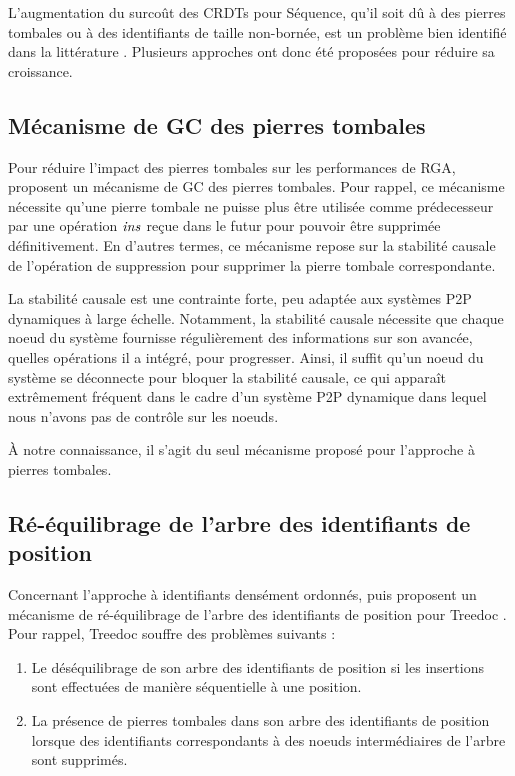 L'augmentation du surcoût des \acp{CRDT} pour Séquence, qu'il soit dû à des pierres tombales ou à des identifiants de taille non-bornée, est un problème bien identifié dans la littérature \cite{ROH2011354,2009-treedoc-preguica,letia:hal-01248270,zawirski:hal-01248197,lseq2013,lseq2017}.
Plusieurs approches ont donc été proposées pour réduire sa croissance.

\subsection{Mécanisme de \ac{GC} des pierres tombales}

Pour réduire l'impact des pierres tombales sur les performances de \ac{RGA}, \textcite{ROH2011354} proposent un mécanisme de \ac{GC} des pierres tombales.
Pour rappel, ce mécanisme nécessite qu'une pierre tombale ne puisse plus être utilisée comme prédecesseur par une opération $\mathit{ins}$ reçue dans le futur pour pouvoir être supprimée définitivement.
En d'autres termes, ce mécanisme repose sur la stabilité causale de l'opération de suppression pour supprimer la pierre tombale correspondante.

La stabilité causale est une contrainte forte, peu adaptée aux systèmes \ac{P2P} dynamiques à large échelle.
Notamment, la stabilité causale nécessite que chaque noeud du système fournisse régulièrement des informations sur son avancée, \ie quelles opérations il a intégré, pour progresser.
Ainsi, il suffit qu'un noeud du système se déconnecte pour bloquer la stabilité causale, ce qui apparaît extrêmement fréquent dans le cadre d'un système \ac{P2P} dynamique dans lequel nous n'avons pas de contrôle sur les noeuds.

À notre connaissance, il s'agit du seul mécanisme proposé pour l'approche à pierres tombales.

\subsection{Ré-équilibrage de l'arbre des identifiants de position}
\label{sec:etat-art-core-nebula}

Concernant l'approche à identifiants densément ordonnés, \textcite{letia:hal-01248270} puis \textcite{zawirski:hal-01248197} proposent un mécanisme de ré-équilibrage de l'arbre des identifiants de position pour Treedoc \cite{2009-treedoc-preguica}.
Pour rappel, Treedoc souffre des problèmes suivants :
\begin{enumerate}
    \item Le déséquilibrage de son arbre des identifiants de position si les insertions sont effectuées de manière séquentielle à une position.
    \item La présence de pierres tombales dans son arbre des identifiants de position lorsque des identifiants correspondants à des noeuds intermédiaires de l'arbre sont supprimés.
\end{enumerate}

